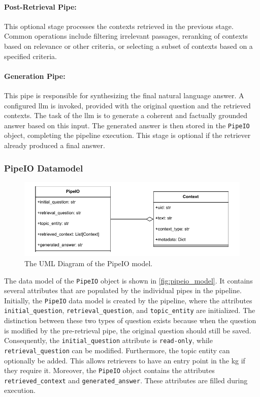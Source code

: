 \paragraph{Post-Retrieval Pipe:} 
This optional stage processes the contexts retrieved in the previous stage. Common operations include filtering irrelevant passages, reranking of contexts based on relevance or other criteria, or selecting a subset of contexts based on a specified criteria.

\paragraph{Generation Pipe:}
This pipe is responsible for synthesizing the final natural language answer. A configured \gls{llm} is invoked, provided with the original question and the retrieved contexts. The task of the \gls{llm} is to generate a coherent and factually grounded answer based on this input. The generated answer is then stored in the \texttt{PipeIO} object, completing the pipeline execution. This stage is optional if the retriever already produced a final answer.


\subsubsection{PipeIO Datamodel}
\begin{figure}[t]
    \centering
    \includegraphics[width=0.90\linewidth]{figures/framework/figures-pipeIO_model.drawio.pdf}
    \caption[UML Diagram for the PipeIO Data Model in the SQA Framework]{The UML Diagram of the PipeIO model.}
    \label{fig:pipeio_model}
\end{figure}

The data model of the \texttt{PipeIO} object is shown in \autoref{fig:pipeio_model}. It contains several attributes that are populated by the individual pipes in the pipeline. Initially, the \texttt{PipeIO} data model is created by the pipeline, where the attributes \texttt{initial\_question}, \texttt{retrieval\_question}, and \texttt{topic\_entity} are initialized. The distinction between these two types of question exists because when the question is modified by the pre-retrieval pipe, the original question should still be saved. Consequently, the \texttt{initial\_question} attribute is \texttt{read-only}, while \texttt{retrieval\_question} can be modified. Furthermore, the topic entity can optionally be added. This allows retrievers to have an entry point in the \gls{kg} if they require it. Moreover, the \texttt{PipeIO} object contains the attributes \texttt{retrieved\_context} and \texttt{generated\_answer}. These attributes are filled during execution. 



